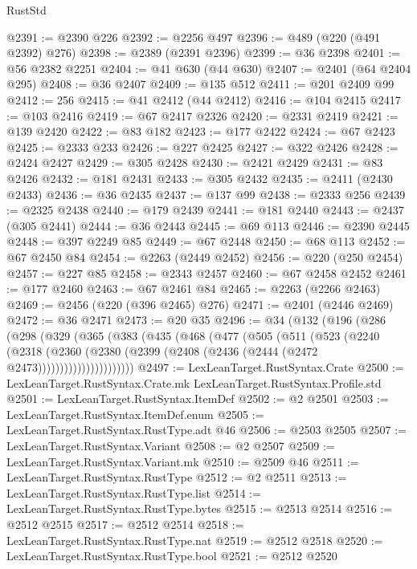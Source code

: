 \begin{lexlean}{RustStd}
\begin{coremodule}
@2391 := @2390 @226
@2392 := @2256 @497
@2396 := @489 (@220 (@491 @2392) @276)
@2398 := @2389 (@2391 @2396)
@2399 := @36 @2398
@2401 := @56 @2382 @2251
@2404 := @41 @630 (@44 @630)
@2407 := @2401 (@64 @2404 @295)
@2408 := @36 @2407
@2409 := @135 @512
@2411 := @201 @2409 @99
@2412 := 256
@2415 := @41 @2412 (@44 @2412)
@2416 := @104 @2415
@2417 := @103 @2416
@2419 := @67 @2417 @2326
@2420 := @2331 @2419
@2421 := @139 @2420
@2422 := @83 @182
@2423 := @177 @2422
@2424 := @67 @2423
@2425 := @2333 @233
@2426 := @227 @2425
@2427 := @322 @2426
@2428 := @2424 @2427
@2429 := @305 @2428
@2430 := @2421 @2429
@2431 := @83 @2426
@2432 := @181 @2431
@2433 := @305 @2432
@2435 := @2411 (@2430 @2433)
@2436 := @36 @2435
@2437 := @137 @99
@2438 := @2333 @256
@2439 := @2325 @2438
@2440 := @179 @2439
@2441 := @181 @2440
@2443 := @2437 (@305 @2441)
@2444 := @36 @2443
@2445 := @69 @113
@2446 := @2390 @2445
@2448 := @397 @2249 @85
@2449 := @67 @2448
@2450 := @68 @113
@2452 := @67 @2450 @84
@2454 := @2263 (@2449 @2452)
@2456 := @220 (@250 @2454)
@2457 := @227 @85
@2458 := @2343 @2457
@2460 := @67 @2458 @2452
@2461 := @177 @2460
@2463 := @67 @2461 @84
@2465 := @2263 (@2266 @2463)
@2469 := @2456 (@220 (@396 @2465) @276)
@2471 := @2401 (@2446 @2469)
@2472 := @36 @2471
@2473 := @20 @35
@2496 := @34
    (@132
      (@196
        (@286
          (@298
            (@329
              (@365
                (@383
                  (@435
                    (@468
                      (@477
                        (@505
                          (@511
                            (@523
                              (@2240
                                (@2318
                                  (@2360
                                    (@2380
                                      (@2399 (@2408 (@2436 (@2444 (@2472 @2473))))))))))))))))))))))
@2497 := LexLeanTarget.RustSyntax.Crate
@2500 := LexLeanTarget.RustSyntax.Crate.mk LexLeanTarget.RustSyntax.Profile.std
@2501 := LexLeanTarget.RustSyntax.ItemDef
@2502 := @2 @2501
@2503 := LexLeanTarget.RustSyntax.ItemDef.enum
@2505 := LexLeanTarget.RustSyntax.RustType.adt @46
@2506 := @2503 @2505
@2507 := LexLeanTarget.RustSyntax.Variant
@2508 := @2 @2507
@2509 := LexLeanTarget.RustSyntax.Variant.mk
@2510 := @2509 @46
@2511 := LexLeanTarget.RustSyntax.RustType
@2512 := @2 @2511
@2513 := LexLeanTarget.RustSyntax.RustType.list
@2514 := LexLeanTarget.RustSyntax.RustType.bytes
@2515 := @2513 @2514
@2516 := @2512 @2515
@2517 := @2512 @2514
@2518 := LexLeanTarget.RustSyntax.RustType.nat
@2519 := @2512 @2518
@2520 := LexLeanTarget.RustSyntax.RustType.bool
@2521 := @2512 @2520

\end{coremodule}
\end{lexlean}
